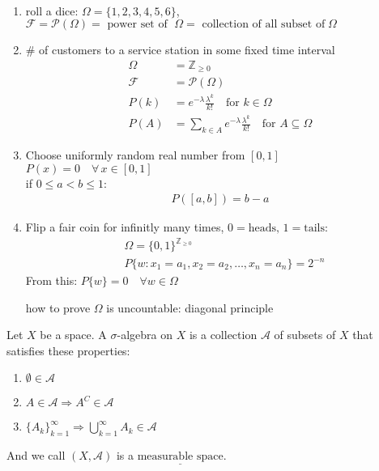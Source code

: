 \documentclass[11pt]{article}
\begin{document}
\begin{example}
    \, 

    \begin{enumerate}
        \item roll a dice: $ \Omega = \{1,2,3,4,5,6 \}$, 
        $\mathcal{F} = \mathcal{P}(\Omega) = \text{ power set of }
        \; \Omega = \text{ collection of all subset of} \; \Omega$
        \item \# of customers to a service station in some fixed time interval 
                \begin{align*}
                    \Omega &= \mathbb{Z}_{\ge 0} \\
                    \mathcal{F} &= \mathcal{P}(\Omega)\\
                    P(k) &= e^{-\lambda }\frac{\lambda^k}{k!} \quad \text{for }k \in \Omega\\
                    P(A) &= \sum_{k \in A} e^{-\lambda }\frac{\lambda^k}{k!} \quad \text{for } A \subseteq \Omega
                \end{align*}
        \item Choose uniformly random real number from $[0,1]$ \\
                $P(x) = 0 \quad \forall \, x \in [0,1]$ \\
                if $0 \le a < b \le 1$:
                \begin{align*}
                    P([a,b]) = b-a
                \end{align*}
        \item \label{example:1.1.4} 
                Flip a fair coin for infinitly many times, $0 = \text{heads}, \, 1=\text{tails}$:
                \begin{align*}
                    &\Omega = \{0,1\}^{\mathbb{Z}_{\ge 0}} \\
                    &P\{w: x_1 = a_1, x_2=a_2, \ldots , x_n = a_n\} = 2^{-n} \label{*} \tag{*}
                \end{align*}
                From this: $P\{w\} = 0 \quad \forall w \in \Omega$
                \begin{exercise}
                    how to prove $\Omega$ is uncountable: diagonal principle
                \end{exercise}
    \end{enumerate}
\end{example}

\begin{definition}
    Let $X$ be a space. A $\sigma$-algebra on $X$ is a collection $\mathcal{A}$ of subsets of $X$ that
    satisfies these properties:
    \begin{enumerate}
        \item $\emptyset \in \mathcal{A}$
        \item $A \in \mathcal{A} \Longrightarrow  A^C \in \mathcal{A}$
        \item $\{A_k \}_{k=1}^{\infty} \Longrightarrow \bigcup_{k=1}^{\infty}A_k \in \mathcal{A}$ 
    \end{enumerate}
    And we call $(X, \mathcal{A})$ is a $\underline{\text{measurable space}}$.
\end{definition}
\end{document}
